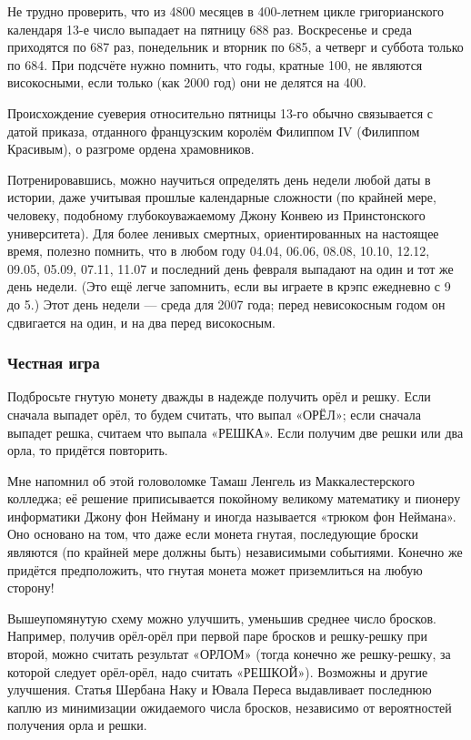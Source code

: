 Не трудно проверить, что из 4800 месяцев в 400-летнем цикле григорианского календаря 13-е число выпадает на пятницу 688 раз.
Воскресенье и среда приходятся по 687 раз, понедельник и вторник по 685, а четверг и суббота только по 684.
При подсчёте нужно помнить, что годы, кратные 100, не являются високосными, если только (как 2000 год) они не делятся на 400.

Происхождение суеверия относительно пятницы 13-го обычно связывается с датой приказа, отданного французским королём Филиппом IV (Филиппом Красивым), о разгроме ордена храмовников.

Потренировавшись, можно научиться определять день недели любой даты в истории, даже учитывая прошлые календарные сложности
(по крайней мере, человеку, подобному глубокоуважаемому Джону Конвею из Принстонского университета).
Для более ленивых смертных, ориентированных на настоящее время, полезно помнить, что в любом году
04.04, 06.06, 08.08, 10.10, 12.12, 09.05, 05.09, 07.11, 11.07 и последний день февраля выпадают на один и тот же день недели.
(Это ещё легче запомнить, если вы играете в крэпс ежедневно с 9 до 5.)
Этот день недели --- среда для 2007 года;
перед невисокосным годом он сдвигается на один, и на два перед високосным.

\subsubsection*{Честная игра}

Подбросьте гнутую монету дважды в надежде получить орёл и решку.
Если сначала выпадет орёл, то будем считать, что выпал «ОРЁЛ»;
если сначала выпадет решка, считаем что выпала «РЕШКА».
Если получим две решки или два орла, то придётся повторить.

Мне напомнил об этой головоломке Тамаш Ленгель из Маккалестерского колледжа;
её решение приписывается покойному великому математику и пионеру информатики Джону фон Нейману и иногда называется «трюком фон Неймана».
Оно основано на том, что даже если монета гнутая, последующие броски являются (по крайней мере должны быть) независимыми событиями.
Конечно же придётся предположить, что гнутая монета может приземлиться на любую сторону!

Вышеупомянутую схему можно улучшить, уменьшив среднее число бросков.
Например, получив орёл-орёл при первой паре бросков и решку-решку при второй, можно считать результат «ОРЛОМ» (тогда конечно же решку-решку, за которой следует орёл-орёл, надо считать «РЕШКОЙ»).
Возможны и другие улучшения.
Статья Шербана Наку и Ювала Переса \cite{nacu-peres} выдавливает последнюю каплю из минимизации ожидаемого числа бросков, независимо от вероятностей получения орла и решки.

